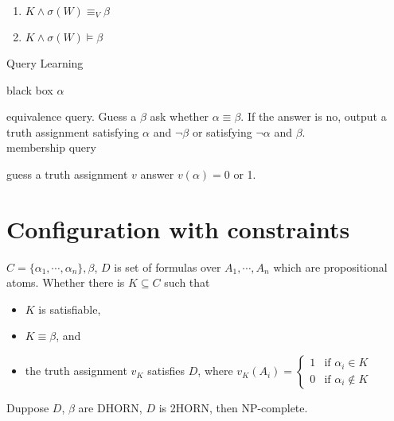 \documentclass[12pt]{article}
\begin{document}
{\begin{enumerate}
\item $K\wedge\sigma(W) \equiv_V\beta$

\item $K\wedge\sigma(W)\models \beta$
\end{enumerate}


Query Learning 

black box $\alpha$   

equivalence query. Guess a $\beta$ ask whether $\alpha\equiv \beta$. If the answer is no, output a truth assignment satisfying $\alpha$ and $\neg \beta$ or satisfying $\neg\alpha$ and $\beta$.\\

membership query

guess a truth assignment $v$ answer $v(\alpha)=0$ or 1. \\






 


\section{Configuration with constraints}

$C=\{\alpha_1,\cdots, \alpha_n\}, \beta$,
$D$ is set of formulas over $A_1,\cdots, A_n$ which are propositional atoms.
Whether there is $K\subseteq C$ such that 
\begin{itemize}
\item $K$ is satisfiable,
\item $K\equiv\beta$, and
\item the truth assignment $v_K$ satisfies $D$, where $v_K(A_i)=\left\{\begin{array}{ll}
1 & \text{if } \alpha_i\in K\\ 0 & \text{if }\alpha_i\not\in K\end{array}\right.$  

\end{itemize}

Duppose $D$, $\beta$ are DHORN, $D$ is 2HORN, then NP-complete.\\




}
\end{document}
